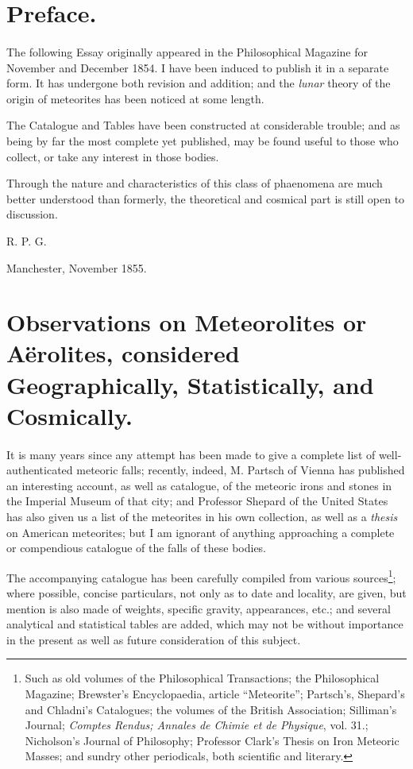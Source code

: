 \documentclass[a4paper, 12pt, oneside]{article}
\begin{document}
\section*{Preface.}
\paragraph{}
The following Essay originally appeared in the Philosophical Magazine for November and December 1854. I have been induced to publish it in a separate form. It has undergone both revision and addition; and the \emph{lunar} theory of the origin of meteorites has been noticed at some length.

The Catalogue and Tables have been constructed at considerable trouble; and as being by far the most complete yet published, may be found useful to those who collect, or take any interest in those bodies.

Through the nature and characteristics of this class of phaenomena are much better understood than formerly, the theoretical and cosmical part is still open to discussion.

\bigskip

R. P. G.

\bigskip

Manchester, November 1855.
\clearpage
\section{Observations on Meteorolites or Aërolites, considered Geographically, Statistically, and Cosmically.}
\paragraph{}
It is many years since any attempt has been made to give a complete list of well-authenticated meteoric falls; recently, indeed, M. Partsch of Vienna has published an interesting account, as well as catalogue, of the meteoric irons and stones in the Imperial Museum of that city; and Professor Shepard of the United States has also given us a list of the meteorites in his own collection, as well as a \emph{thesis} on American meteorites; but I am ignorant of anything approaching a complete or compendious catalogue of the falls of these bodies.

The accompanying catalogue has been carefully compiled from various sources\footnote{Such as old volumes of the Philosophical Transactions; the Philosophical Magazine; Brewster's Encyclopaedia, article ``Meteorite''; Partsch's, Shepard's and Chladni's Catalogues; the volumes of the British Association; Silliman's Journal; \emph{Comptes Rendus; Annales de Chimie et de Physique}, vol. 31.; Nicholson's Journal of Philosophy; Professor Clark's Thesis on Iron Meteoric Masses; and sundry other periodicals, both scientific and literary.}; where possible, concise particulars, not only as to date and locality, are given, but mention is also made of weights, specific gravity, appearances, etc.; and several analytical and statistical tables are added, which may not be without importance in the present as well as future consideration of this subject.
\end{document}
